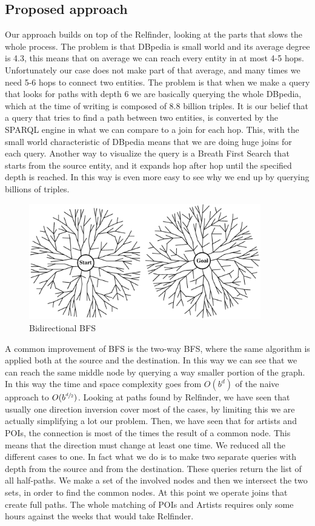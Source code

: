 \documentclass[paper=a4, fontsize=11pt]{scrartcl}
\begin{document}
\subsection{Proposed approach}
Our approach builds on top of the Relfinder, looking at the parts that slows the whole process. 
The problem is that DBpedia is small world and its average degree is 4.3, this means that on average we can reach every entity in at most 4-5 hops. Unfortunately our case does not make part of that average, and many times we need 5-6 hops to connect two entities. The problem is that when we make a query that looks for paths with depth 6 we are basically querying the whole DBpedia, which at the time of writing is composed of 8.8 billion triples.
It is our belief that a query that tries to find a path between two entities, is converted by the SPARQL engine in what we can compare to a join for each hop. This, with the small world characteristic of DBpedia means that we are doing huge joins for each query.
Another way to visualize the query is a Breath First Search that starts from the source entity, and it expands hop after hop until the specified depth is reached. In this way is even more easy to see why we end up by querying billions of triples.

\begin{figure}[!htb]
  \centering 
    \includegraphics[width=0.9\textwidth]{images/bfs.png}
    \caption{Bidirectional BFS \cite{artificial_intelligence}}
\end{figure}

A common improvement of BFS is the two-way BFS, where the same algorithm is applied both at the source and the destination. In this way we can see that we can reach the same middle node by querying a way smaller portion of the graph. In this way the time and space complexity goes from $O(b^d)$ of the naive approach to $O(b^{\sfrac{d}{2}})$.
Looking at paths found by Relfinder, we have seen that usually one direction inversion cover most of the cases, by limiting this we are actually simplifying a lot our problem. Then, we have seen that for artists and POIs, the connection is most of the times the result of a common node. This means that the direction must change at least one time. We reduced all the different cases to one. In fact what we do is to make two separate queries with depth from the source and from the destination. These queries return the list of all half-paths. We make a set of the involved nodes and then we intersect the two sets, in order to find the common nodes. At this point we operate joins that create full paths. The whole matching of POIs and Artists  requires only some hours against the weeks that would take Relfinder.
\end{document}
